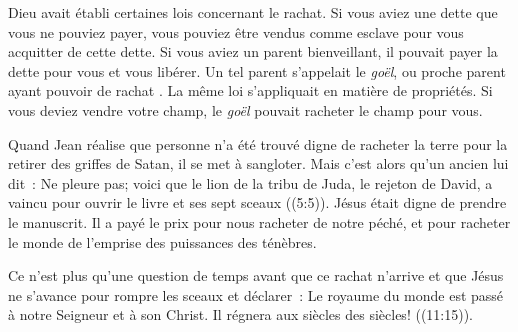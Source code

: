 \dvrule







 Dieu avait établi certaines lois concernant le rachat.
 Si vous aviez une dette que vous ne pouviez payer,
 vous pouviez être vendus comme esclave pour vous acquitter
 de cette dette. Si vous aviez un parent bienveillant,
 il pouvait payer la dette pour vous et vous libérer.
 Un tel parent s'appelait le \emph{goël}, 
 ou \og proche parent ayant pouvoir de rachat \fg{}.
 La même loi s'appliquait en matière de propriétés.
 Si vous deviez vendre votre champ, le \emph{goël}
 pouvait racheter le champ pour vous. 

Quand Jean réalise que personne n'a été trouvé digne de racheter
 la terre pour la retirer des griffes de Satan, il se met à sangloter.
 Mais c'est alors qu'un ancien lui dit~: 
 \og Ne pleure pas; voici que le lion de la tribu de Juda,
 le rejeton de David, a vaincu pour ouvrir le livre et ses sept sceaux \fg{}
 ((5:5)).
 Jésus était digne de prendre le manuscrit. Il a payé le prix
 pour nous racheter de notre péché, et pour racheter le monde
 de l'emprise des puissances des ténèbres. 


Ce n'est plus qu'une question de temps avant que ce rachat n'arrive
 et que Jésus ne s'avance pour rompre les sceaux et déclarer~: 
 \og Le royaume du monde est passé à notre Seigneur et à son Christ.
 Il régnera aux siècles des siècles! \fg{} ((11:15)). 

\dvrule




